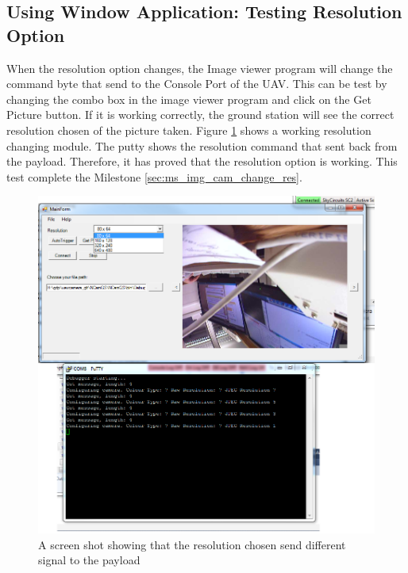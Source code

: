 \subsection{Using Window Application: Testing Resolution Option}

When the resolution option changes, the Image viewer program will change the command byte that send to the Console Port of the UAV. 
This can be test by changing the combo box in the image viewer program and click on the Get Picture button.
If it is working correctly, the ground station will see the correct resolution chosen of the picture taken.
Figure \ref{resolution testing} shows a working resolution changing module. 
The putty shows the resolution command that sent back from the payload.
Therefore, it has proved that the resolution option is working.
This test complete the Milestone \ref{sec:ms_img_cam_change_res}.

\begin{figure}[H]
\begin{center}
\includegraphics[scale=0.5]{testing_screenshots/change_res_ncam_1.png}    
\end{center}
\caption{A screen shot showing that the resolution chosen send different signal to the payload\label{resolution testing}}
\end{figure}


